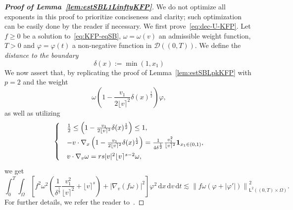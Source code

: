 \documentclass[11pt]{amsart}
\theoremstyle{definition}
\theoremstyle{remark}
\numberwithin{equation}{section}
\newcommand{\dd}{{\, \mathrm d}}
\newcommand{\sfL}{\mathsf{L}}
\newcommand{\wangle}[1]{\lfloor #1 \rceil}
\begin{document}
\begin{proof}[{\bf Proof of Lemma~\ref{lem:estSBL1LinftyKFP}}] We do not optimize all exponents in this proof to prioritize conciseness and clarity; such optimization can be easily done by the reader if necessary. We first prove~\eqref{eq:dec-U-KFP}. Let $f \ge 0$ be a solution to~\eqref{eq:KFP-eqSB}, $\omega=\omega(v)$ an admissible weight function, $T>0$ and  $\varphi=\varphi(t)$ a non-negative function in $\mathcal D((0,T))$. We define the \emph{distance to the boundary}
\begin{equation*}
  \delta(x) := \min(1,x_1)
\end{equation*}
We now assert that, by replicating the proof of Lemma~\ref{lem:estSBLpkKFP} with $p=2$ and the weight
\begin{equation*}
  \omega \left( 1 - \frac{v_1}{2\wangle{v}^2} \delta(x)^{\frac{1}{2}} \right)  \varphi,
\end{equation*}
as well as utilizing
\begin{equation*}
  \begin{cases}
    & \frac{1}{2} \le \left( 1 - \frac{v_1}{2\wangle{v}^2} \delta(x)^{\frac{1}{2}} \right)  \le 1, \\[2mm]
    \displaystyle
    & - v \cdot \nabla_x \left( 1 - \frac{v_1}{2\wangle{v}^2} \delta(x)^{\frac{1}{2}} \right)  = \frac{1}{4 \delta^{\frac{1}{2}}} \frac{v_1^2}{\wangle{v}^2}  {\bf 1}_{x_1 \in (0,1)}, \\[2mm]
    & v \cdot \nabla_v \omega = r s |v|^2 \wangle{v}^{s-2} \omega,
  \end{cases}
\end{equation*}
we get
\begin{equation}
  \int_0^T \!\! \int_\Omega \left[  f^2  \omega^2  \left(  \frac{1}{\delta^{\frac{1}{2}}}  \frac{v_1^2}{\wangle{v}^2} + \wangle{v}^s \right) +  |\nabla_v(f \omega )|^2
  \right] \varphi^2 \dd x \dd v \dd t 
  \label{eq:Ultracontractivity1}
  \lesssim \left\| f \omega (\varphi + |\varphi'|) \right\|_{\sfL^2((0,T) \times \Omega)} ^2.
\end{equation}
For further details, we refer the reader to~\cite[Section~3]{carrapatoso2024KFP}.


\end{proof}
\end{document}
